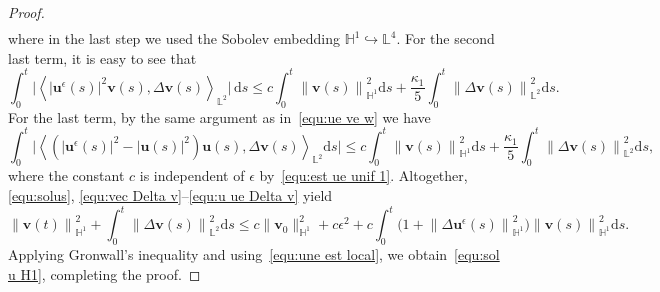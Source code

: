 \documentclass[11pt,reqno]{amsart}
\theoremstyle{definition}
\numberwithin{equation}{section}
\newcommand{\bff}{\boldsymbol}
\newcommand{\bb}{\mathbb}
\newcommand{\ds}{\mathrm{d}s}
\newcommand{\norm}[2]{\left\|{#1}\right\|_{#2}}
\newcommand{\inpro}[2]{\left\langle#1,#2\right\rangle}
\begin{document}
\begin{proof}
\begin{align*}
	\end{align*}
	where in the last step we used the Sobolev embedding $\bb{H}^1\hookrightarrow
	\bb{L}^4$.
	For the second last term, it is easy to see that
	\[
	\int_{0}^{t} 
	\Big|
	\inpro{|\bff{u}^\epsilon(s)|^2\bff{v}(s)}{\Delta \bff{v}(s)}_{\bb{L}^2}\Big| \,\ds
	\leq
	c \int_0^t \norm{\bff{v}(s)}{\bb{H}^1}^2 \ds 
	+
	\frac{\kappa_1}{5} \int_0^t \norm{\Delta \bff{v}(s)}{\bb{L}^2}^2 \ds.
	\]
	For the last term, by the same argument as in~\eqref{equ:ue ve w} we have
	\begin{equation}\label{equ:u ue Delta v}
		\int_0^t 
		\Big|
		\inpro{(|\bff{u}^\epsilon(s)|^2-|\bff{u}(s)|^2)\bff{u}(s)}{\Delta \bff{v}(s)}_{\bb{L}^2} \ds
		\Big|
		\leq
		c \int_0^t \norm{\bff{v}(s)}{\bb{H}^1}^2 \ds 
		+
		\frac{\kappa_1}{5} \int_0^t \norm{\Delta \bff{v}(s)}{\bb{L}^2}^2 \ds,
	\end{equation}
	where the constant $c$ is independent of $\epsilon$ by~\eqref{equ:est ue unif 1}.
	Altogether, \eqref{equ:solus}, \eqref{equ:vec Delta v}--\eqref{equ:u ue	Delta v}
	yield
	\begin{equation*}
		\norm{\bff{v}(t)}{\bb{H}^1}^2 
		+ \int_0^t \norm{\Delta \bff{v}(s)}{\bb{L}^2}^2 \ds 
		\leq
		c \|\bff{v}_0\|_{\bb{H}^1}^2
		+
		c\epsilon^2 
		+ 
		c\int_0^t \big(1+ \norm{\Delta \bff{u}^\epsilon(s)}{\bb{H}^1}^2 \big)
		\norm{\bff{v}(s)}{\bb{H}^1}^2 \ds.
	\end{equation*}
	Applying Gronwall's inequality and using~\eqref{equ:une est local}, we
	obtain~\eqref{equ:sol u H1}, completing the proof.
\end{proof}
\end{document}
